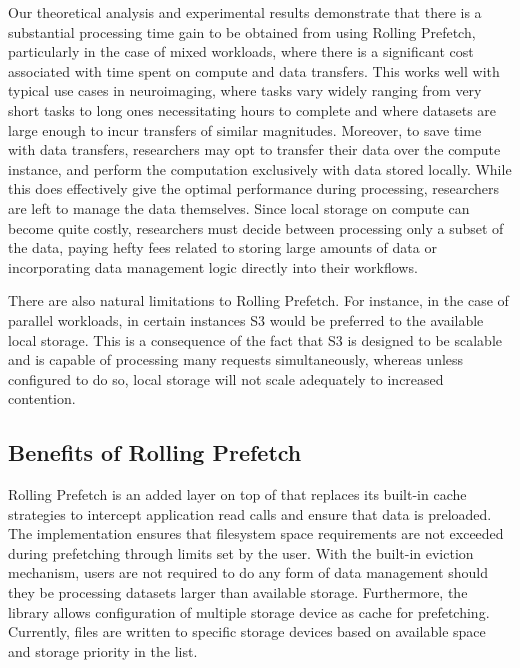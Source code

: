 \documentclass[conference]{IEEEtran}
\begin{document}
Our theoretical analysis and experimental results demonstrate that there is a substantial processing time gain to be
obtained from using Rolling Prefetch, particularly in the case of mixed workloads, where there is a significant
cost associated with time spent on compute and data transfers. This works well with typical use cases in neuroimaging,
where tasks vary widely ranging from very short tasks to long ones necessitating hours to complete and where datasets
are large enough to incur transfers of similar magnitudes. Moreover, to save time with data transfers, researchers
may opt to transfer their data over the compute instance, and perform the computation exclusively with
data stored locally. While this does effectively give the optimal performance during processing, researchers are left to manage
the data themselves. Since local storage on compute can become quite costly, researchers must decide between
processing only a subset of the data, paying hefty fees related to storing large amounts of data or 
incorporating data management logic directly into their workflows. 

There are also natural limitations to
Rolling Prefetch. For instance, in the case of parallel workloads, in certain instances S3 would be
preferred to the available local storage. This is a consequence of the fact that S3 is designed to be scalable
and is capable of processing many requests simultaneously, whereas unless configured to do so, local storage
will not scale adequately to increased contention.


\subsection{Benefits of Rolling Prefetch}

Rolling Prefetch is an added layer on top of \sfs that replaces its built-in cache strategies to intercept
application read calls and ensure that data is preloaded. The implementation ensures that filesystem space requirements are not exceeded during prefetching through limits set by the user. 
With the built-in eviction mechanism, users are not required to do any form of data management should they be processing datasets larger than available storage. Furthermore, the library allows configuration of multiple storage device as cache for prefetching. Currently,
files are written to specific storage devices based on available space and storage priority in the list.
\end{document}
